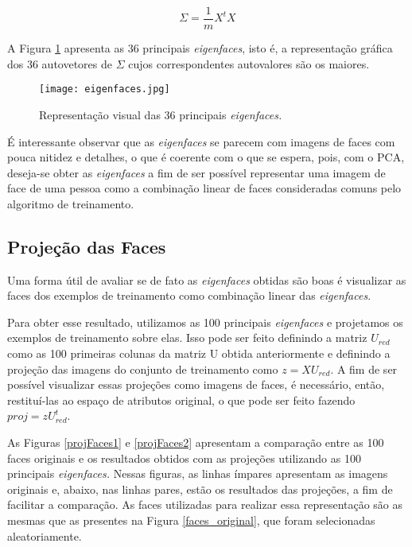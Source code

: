 \documentclass[12pt]{article}
\begin{document}
\begin{equation} \label{eq_sigma}
\Sigma = \frac{1}{m} X^tX
\end{equation}

A Figura \ref{eigenfaces} apresenta as 36 principais \textit{eigenfaces}, isto é, a representação gráfica dos 36 autovetores de $\Sigma$ cujos correspondentes autovalores são os maiores. 

\begin{figure} [htp]
\begin{center}
\texttt{[image: eigenfaces.jpg]}
\caption{Representação visual das 36 principais \textit{eigenfaces.}} \label{eigenfaces}
\end{center}
\end{figure}

É interessante observar que as \textit{eigenfaces} se parecem com imagens de faces com pouca nitidez e detalhes, o que é coerente com o que se espera, pois, com o PCA, deseja-se obter as \textit{eigenfaces} a fim de ser possível representar uma imagem de face de uma pessoa como a combinação linear de faces consideradas comuns pelo algoritmo de treinamento. 

\subsection{Projeção das Faces} \label{proj}
Uma forma útil de avaliar se de fato as \textit{eigenfaces} obtidas são boas é visualizar as faces dos exemplos de treinamento como combinação linear das \textit{eigenfaces}.

Para obter esse resultado, utilizamos as 100 principais \textit{eigenfaces} e projetamos os exemplos de treinamento sobre elas. Isso pode ser feito definindo a matriz $U_{red}$ como as 100 primeiras colunas da matriz U obtida anteriormente e definindo a projeção das imagens do conjunto de treinamento como $z=X U_{red}$. A fim de ser possível visualizar essas projeções como imagens de faces, é necessário, então, restituí-las ao espaço de atributos original, o que pode ser feito fazendo $proj = z U_{red}^t$.

As Figuras \ref{projFaces1} e \ref{projFaces2} apresentam a comparação entre as 100 faces originais e os resultados obtidos com as projeções utilizando as 100 principais \textit{eigenfaces.} Nessas figuras, as linhas ímpares apresentam as imagens originais e, abaixo, nas linhas pares, estão os resultados das projeções, a fim de facilitar a comparação. As faces utilizadas para realizar essa representação são as mesmas que as presentes na Figura \ref{faces_original}, que foram selecionadas aleatoriamente. 
\end{document}
